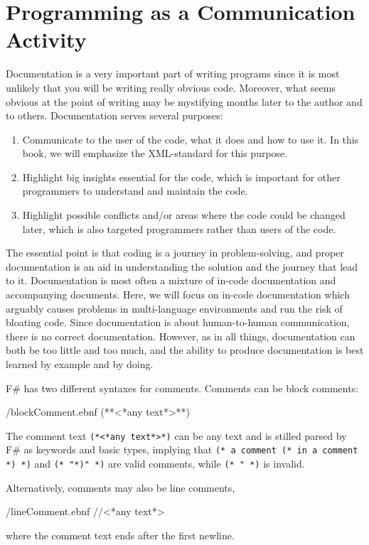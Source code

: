\documentclass[fsharpNotes.tex]{subfiles}
\begin{document}
\section{Programming as a Communication Activity}
\label{chap:documentation}
Documentation is a very important part of writing programs since it is most unlikely that you will be writing really obvious code. Moreover, what seems obvious at the point of writing may be mystifying months later to the author and to others. Documentation serves several purposes:
\begin{enumerate}
\item Communicate to the user of the code, what it does and how to use it. In this book, we will emphasize the XML-standard for this purpose.
\item Highlight big insights essential for the code, which is important for other programmers to understand and maintain the code.
\item Highlight possible conflicts and/or areas where the code could be changed later, which is also targeted programmers rather than users of the code.
\end{enumerate}
The essential point is that coding is a journey in problem-solving, and proper documentation is an aid in understanding the solution and the journey that lead to it. Documentation is most often a mixture of in-code documentation and accompanying documents. Here, we will focus on in-code documentation which arguably causes problems in multi-language environments and run the risk of bloating code. Since documentation is about human-to-human communication, there is no correct documentation. However, as in all things, documentation can both be too little and too much, and the ability to produce documentation is best learned by example and by doing.

F\# has two different syntaxes for comments. Comments can be block
comments: 
%
\begin{verbatimwrite}{\ebnf/blockComment.ebnf}
(**<*any text*>**)
\end{verbatimwrite}
%
The comment text \lstinline[language=syntax]{(*<*any text*>*)} can be any text and is stilled parsed by F\# as keywords and basic types, implying that \lstinline!(* a comment (* in a comment *) *)! and \lstinline[morecomment={[l][\color{commentsColor}]{(*}}]!(* "*)" *)! are valid comments, while \lstinline!(* " *)! is invalid.

Alternatively, comments may also be line comments,
%
\begin{verbatimwrite}{\ebnf/lineComment.ebnf}
//<*any text*>
\end{verbatimwrite}
%
where the comment text ends after the first newline.
\end{document}
